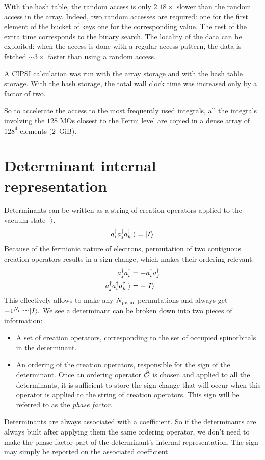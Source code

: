 \documentclass[./thesis.tex]{subfiles}
\begin{document}
With the hash table, the random access is only $2.18\times$ slower than the random access in the array. Indeed, two random accesses are required: one for the first element of the bucket of keys one for the corresponding value. The rest of the extra time corresponds to the binary search. The locality of the data can be exploited: when the access is done with a regular access pattern, the data is fetched $\sim 3\times$ faster than using a random access.

A CIPSI calculation was run with the array storage and with the hash table storage. With the hash storage, the total wall clock time was increased only by a factor of two.

So to accelerate the access to the most frequently used integrals, all the
integrals involving the $128$ MOs closest to the Fermi
level are copied in a dense array of $128^4$ elements ($2$~GiB).

\section{Determinant internal representation}
\label{sec:det_representation}

Determinants can be written as a string of creation operators applied to the vacuum state ${\ket{}}$.
\begin{equation}
a^\dagger_{i} a^\dagger_{j} a^\dagger_{k} {\ket{}} = {\ket{I}}
\end{equation}
Because of the fermionic nature of electrons, permutation of two contiguous creation operators results in a sign change, which makes their ordering relevant.
\begin{align}
a^\dagger_{j} a^\dagger_{i} & = -a^\dagger_{i} a^\dagger_{j} \\
a^\dagger_{j} a^\dagger_{i} a^\dagger_{k} {\ket{}} &=  -{\ket{I}}
\end{align}
This effectively allows to make any ${N_\text{perm}}$ permutations
and always get $-1^{{N_\text{perm}}} {\ket{I}}.$
We see a determinant can be broken down into two pieces of information:
\begin{itemize}
\item
A set of creation operators, corresponding to the set of occupied spinorbitals in the determinant.
\item
An ordering of the creation operators, responsible for the sign of the determinant. Once an ordering operator ${\hat{\mathcal{O}}}$ is chosen and applied to all the determinants, it is sufficient to store the sign change that will occur when this operator is applied to the string of creation operators. This sign will be referred to as the \emph{phase factor}.
\end{itemize}
Determinants are always associated with a coefficient. So
if the determinants are always built after applying them the same ordering operator,
we don't need to make the phase factor part of the determinant's internal representation. The sign may simply be reported on the associated coefficient.
\end{document}
